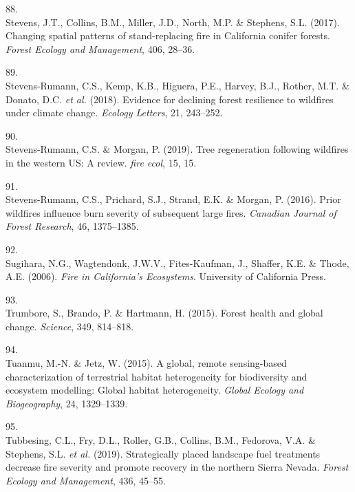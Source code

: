 \documentclass[]{article}
\begin{document}
\leavevmode\hypertarget{ref-stevens2017}{}%
88.\\
Stevens, J.T., Collins, B.M., Miller, J.D., North, M.P. \& Stephens,
S.L. (2017). Changing spatial patterns of stand-replacing fire in
California conifer forests. \emph{Forest Ecology and Management}, 406,
28--36.

\leavevmode\hypertarget{ref-stevens-rumann2018}{}%
89.\\
Stevens-Rumann, C.S., Kemp, K.B., Higuera, P.E., Harvey, B.J., Rother,
M.T. \& Donato, D.C. \emph{et al.} (2018). Evidence for declining forest
resilience to wildfires under climate change. \emph{Ecology Letters},
21, 243--252.

\leavevmode\hypertarget{ref-stevens-rumann2019}{}%
90.\\
Stevens-Rumann, C.S. \& Morgan, P. (2019). Tree regeneration following
wildfires in the western US: A review. \emph{fire ecol}, 15, 15.

\leavevmode\hypertarget{ref-stevens-rumann2016a}{}%
91.\\
Stevens-Rumann, C.S., Prichard, S.J., Strand, E.K. \& Morgan, P. (2016).
Prior wildfires influence burn severity of subsequent large fires.
\emph{Canadian Journal of Forest Research}, 46, 1375--1385.

\leavevmode\hypertarget{ref-sugihara2006}{}%
92.\\
Sugihara, N.G., Wagtendonk, J.W.V., Fites-Kaufman, J., Shaffer, K.E. \&
Thode, A.E. (2006). \emph{Fire in California's Ecosystems}. University
of California Press.

\leavevmode\hypertarget{ref-trumbore2015}{}%
93.\\
Trumbore, S., Brando, P. \& Hartmann, H. (2015). Forest health and
global change. \emph{Science}, 349, 814--818.

\leavevmode\hypertarget{ref-tuanmu2015}{}%
94.\\
Tuanmu, M.-N. \& Jetz, W. (2015). A global, remote sensing-based
characterization of terrestrial habitat heterogeneity for biodiversity
and ecosystem modelling: Global habitat heterogeneity. \emph{Global
Ecology and Biogeography}, 24, 1329--1339.

\leavevmode\hypertarget{ref-tubbesing2019}{}%
95.\\
Tubbesing, C.L., Fry, D.L., Roller, G.B., Collins, B.M., Fedorova, V.A.
\& Stephens, S.L. \emph{et al.} (2019). Strategically placed landscape
fuel treatments decrease fire severity and promote recovery in the
northern Sierra Nevada. \emph{Forest Ecology and Management}, 436,
45--55.
\end{document}
